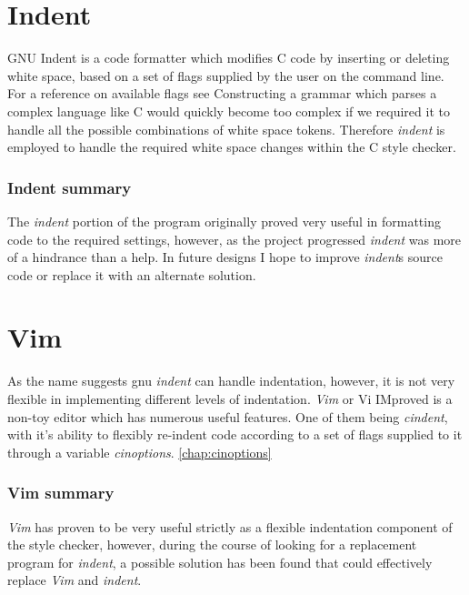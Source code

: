 \section{Indent}

GNU Indent is a code formatter which modifies C code by inserting or deleting
white space, based on a set of flags supplied by the user on the command line.
For a reference on available flags see \citep*{INDENT}
Constructing a grammar which parses a complex language like C would quickly 
become too complex if we required it to handle all the possible combinations of
white space tokens. Therefore \emph{indent} is employed to handle the required 
white space changes within the C style checker. 

\subsubsection{Indent summary}
The \emph{indent} portion of the program originally proved very useful in 
formatting code to the required settings, however, as the project progressed 
\emph{indent} was more of a hindrance than a help. In future designs I hope to 
improve \emph{indent}s source code or replace it with an alternate solution.




\section{Vim}

As the name suggests gnu \emph{indent} can handle indentation, however, it is not 
very flexible in implementing different levels of indentation.
\emph{Vim} or Vi IMproved is a non-toy editor which has numerous useful features.
One of them being \emph{cindent}, with it's ability to flexibly re-indent code 
according to a set of flags supplied to it through a variable 
\emph{cinoptions}. \autoref{chap:cinoptions}

\subsubsection{Vim summary}
\emph{Vim} has proven to be very useful strictly as a flexible indentation 
component of the style checker, however, during the course of looking for a 
replacement program for \emph{indent}, a possible solution has been found that 
could effectively replace \emph{Vim} and \emph{indent}. 


